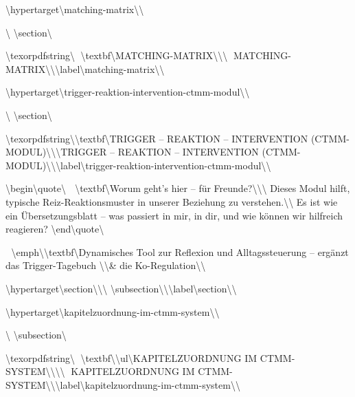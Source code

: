 \textbackslash{}hypertarget\textbackslash{}{matching-matrix\textbackslash{}}\textbackslash{}{\textbackslash{}%
\textbackslash{}section\textbackslash{}{\textbackslash{}texorpdfstring\textbackslash{}{🧩 \textbackslash{}textbf\textbackslash{}{MATCHING-MATRIX\textbackslash{}}\textbackslash{}}{\textbackslash{}{🧩 MATCHING-MATRIX\textbackslash{}}\textbackslash{}}{\textbackslash{}label\textbackslash{}{matching-matrix\textbackslash{}}\textbackslash{}}

\textbackslash{}hypertarget\textbackslash{}{trigger-reaktion-intervention-ctmm-modul\textbackslash{}}\textbackslash{}{\textbackslash{}%
\textbackslash{}section\textbackslash{}{\textbackslash{}texorpdfstring\textbackslash{}{\textbackslash{}textbf\textbackslash{}{TRIGGER -- REAKTION -- INTERVENTION (CTMM-MODUL)\textbackslash{}}\textbackslash{}}{\textbackslash{}{TRIGGER -- REAKTION -- INTERVENTION (CTMM-MODUL)\textbackslash{}}\textbackslash{}}{\textbackslash{}label\textbackslash{}{trigger-reaktion-intervention-ctmm-modul\textbackslash{}}\textbackslash{}}

\textbackslash{}begin\textbackslash{}{quote\textbackslash{}}
🧠 \textbackslash{}textbf\textbackslash{}{Worum geht's hier -- für Freunde?\textbackslash{}}\textbackslash{}\textbackslash{}
Dieses Modul hilft, typische Reiz-Reaktionsmuster in unserer Beziehung zu verstehen.\textbackslash{}\textbackslash{}
Es ist wie ein Übersetzungsblatt -- was passiert in mir, in dir, und wie können wir hilfreich reagieren?
\textbackslash{}end\textbackslash{}{quote\textbackslash{}}

🧩 \textbackslash{}emph\textbackslash{}{\textbackslash{}textbf\textbackslash{}{Dynamisches Tool zur Reflexion und Alltagssteuerung -- ergänzt das Trigger-Tagebuch \textbackslash{}\textbackslash{}& die Ko-Regulation\textbackslash{}}\textbackslash{}}

\textbackslash{}hypertarget\textbackslash{}{section\textbackslash{}}\textbackslash{}{\textbackslash{}%
\textbackslash{}subsection\textbackslash{}{\textbackslash{}}\textbackslash{}label\textbackslash{}{section\textbackslash{}}\textbackslash{}}

\textbackslash{}hypertarget\textbackslash{}{kapitelzuordnung-im-ctmm-system\textbackslash{}}\textbackslash{}{\textbackslash{}%
\textbackslash{}subsection\textbackslash{}{\textbackslash{}texorpdfstring\textbackslash{}{📘 \textbackslash{}textbf\textbackslash{}{\textbackslash{}ul\textbackslash{}{KAPITELZUORDNUNG IM CTMM-SYSTEM\textbackslash{}}\textbackslash{}}\textbackslash{}}{\textbackslash{}{📘 KAPITELZUORDNUNG IM CTMM-SYSTEM\textbackslash{}}\textbackslash{}}{\textbackslash{}label\textbackslash{}{kapitelzuordnung-im-ctmm-system\textbackslash{}}\textbackslash{}}

}}}}}}

